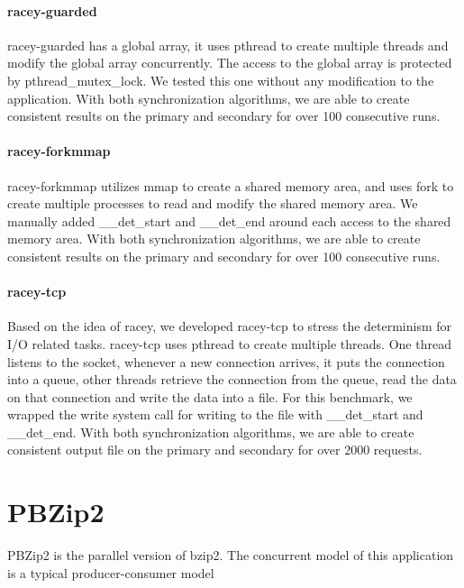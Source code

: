 \paragraph{racey-guarded} racey-guarded has a global array, it uses pthread to create multiple threads and modify the global array concurrently. The access to the global array is protected by pthread\_mutex\_lock. We tested this one without any modification to the application. With both synchronization algorithms, we are able to create consistent results on the primary and secondary for over 100 consecutive runs.

\paragraph{racey-forkmmap} racey-forkmmap utilizes mmap to create a shared memory area, and uses fork to create multiple processes to read and modify the shared memory area. We manually added \_\_det\_start and \_\_det\_end around each access to the shared memory area. With both synchronization algorithms, we are able to create consistent results on the primary and secondary for over 100 consecutive runs.

\paragraph{racey-tcp} Based on the idea of racey, we developed racey-tcp to stress the determinism for I/O related tasks. racey-tcp uses pthread to create multiple threads. One thread listens to the socket, whenever a new connection arrives, it puts the connection into a queue, other threads retrieve the connection from the queue, read the data on that connection and write the data into a file. For this benchmark, we wrapped the write system call for writing to the file with \_\_det\_start and \_\_det\_end. With both synchronization algorithms, we are able to create consistent output file on the primary and secondary for over 2000 requests.

\section{PBZip2}
PBZip2 is the parallel version of bzip2. The concurrent model of this application is a typical producer-consumer model



